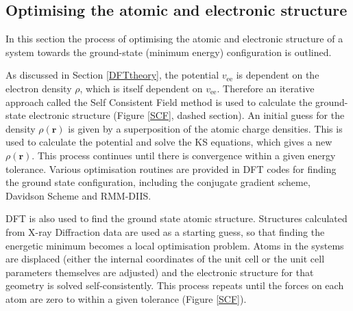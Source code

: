 
\subsection{Optimising the atomic and electronic structure} \label{SCFsubsection}

In this section the process of optimising the atomic and electronic structure of a system towards the ground-state (minimum energy) configuration is outlined. 

As discussed in Section \ref{DFTtheory}, the potential $v_\textrm{ee}$ is dependent on the electron density $\rho$, which is itself dependent on $v_\textrm{ee}$. Therefore an iterative approach called the Self Consistent Field method is used to calculate the ground-state electronic structure (Figure \ref{SCF}, dashed section). An initial guess for the density $\rho(\textbf{r})$ is given by a superposition of the atomic charge densities. This is used to calculate the potential and solve the KS equations, which gives a new $\rho(\textbf{r})$. This process continues until there is convergence within a given energy tolerance. Various optimisation routines are provided in DFT codes for finding the ground state configuration, including the conjugate gradient scheme, Davidson Scheme and RMM-DIIS.

DFT is also used to find the ground state atomic structure. Structures calculated from X-ray Diffraction data are used as a starting guess, so that finding the energetic minimum becomes a local optimisation problem. Atoms in the systems are displaced (either the internal coordinates of the unit cell or the unit cell parameters themselves are adjusted) and the electronic structure for that geometry is solved self-consistently. This process repeats until the forces on each atom are zero to within a given tolerance (Figure \ref{SCF}). 

